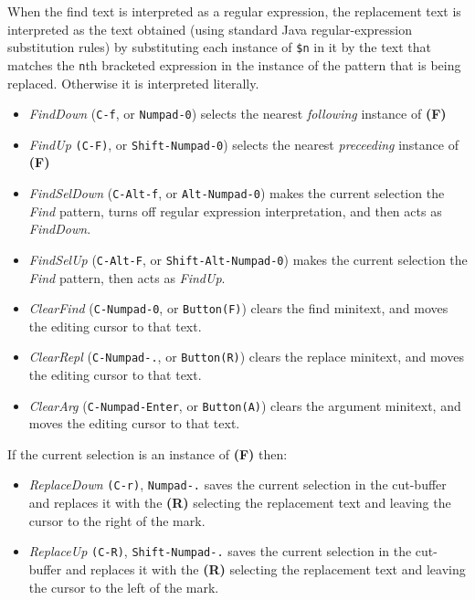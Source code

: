 \documentclass[12pt,a4paper]{article}
\begin{document}
When the find text is interpreted as a regular expression, the
replacement text is interpreted as the text obtained (using standard
Java regular-expression substitution rules) by substituting each
instance of \texttt{\$n} in it by the text that matches the \texttt{n}th
bracketed expression in the instance of the pattern that is being
replaced. Otherwise it is interpreted literally.

\begin{itemize}
\item
  \emph{FindDown} (\texttt{C-f}, or \texttt{Numpad-0}) selects the
  nearest \emph{following} instance of \textbf{(F)}
\item
  \emph{FindUp} \texttt{(C-F)}, or \texttt{Shift-Numpad-0}) selects the
  nearest \emph{preceeding} instance of \textbf{(F)}
\item
  \emph{FindSelDown} (\texttt{C-Alt-f}, or \texttt{Alt-Numpad-0}) makes
  the current selection the \emph{Find} pattern, turns off regular
  expression interpretation, and then acts as \emph{FindDown}.
\item
  \emph{FindSelUp} (\texttt{C-Alt-F}, or \texttt{Shift-Alt-Numpad-0})
  makes the current selection the \emph{Find} pattern, then acts as
  \emph{FindUp}.
\item
  \emph{ClearFind} (\texttt{C-Numpad-0}, or \texttt{Button(F)}) clears
  the find minitext, and moves the editing cursor to that text.
\item
  \emph{ClearRepl} (\texttt{C-Numpad-.}, or \texttt{Button(R)}) clears
  the replace minitext, and moves the editing cursor to that text.
\item
  \emph{ClearArg} (\texttt{C-Numpad-Enter}, or \texttt{Button(A)})
  clears the argument minitext, and moves the editing cursor to that
  text.
\end{itemize}

If the current selection is an instance of \textbf{(F)} then:

\begin{itemize}
\item
  \emph{ReplaceDown} \texttt{(C-r)}, \texttt{Numpad-.} saves the current
  selection in the cut-buffer and replaces it with the \textbf{(R)}
  selecting the replacement text and leaving the cursor to the right of
  the mark.
\item
  \emph{ReplaceUp} \texttt{(C-R)}, \texttt{Shift-Numpad-.} saves the
  current selection in the cut-buffer and replaces it with the
  \textbf{(R)} selecting the replacement text and leaving the cursor to
  the left of the mark.
\end{itemize}
\end{document}
